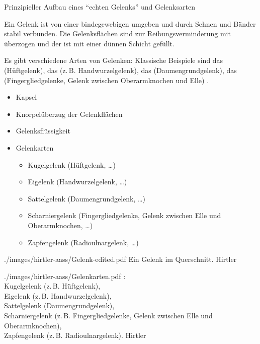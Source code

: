 {Prinzipieller Aufbau eines \protect\enquote{echten Gelenks}
und Gelenksarten}
{%
Ein Gelenk ist von einer bindegewebigen  umgeben
und durch Sehnen und Bänder stabil verbunden.
Die Gelenksflächen sind zur Reibungs\-ver\-minderung mit 
 überzogen und der  ist mit
einer dünnen Schicht 
 gefüllt. 

%
%
%
%
%
%
Es gibt verschiedene Arten von Gelenken: Klassische
Beispiele sind das  (Hüftgelenk),
 das  (z.\,B. Handwurzelgelenk),
das  (Daumengrundgelenk), das
 (Fingergliedgelenke, Gelenk zwischen
Oberarmknochen und Elle) .


\bigskip

\bigskip

}{%
\begin{itemize}
  \item Kapsel
  \item Knorpelüberzug der Gelenkflächen
  \item Gelenksflüssigkeit
  \item Gelenkarten
  \begin{itemize}
  \item Kugelgelenk (Hüftgelenk, \ldots)
  \item Eigelenk (Handwurzelgelenk, \ldots)
  \item Sattelgelenk (Daumengrundgelenk, \ldots)
  \item Scharniergelenk (Fingergliedgelenke, Gelenk zwischen Elle und
  Oberarmknochen, \ldots)
  \item Zapfengelenk (Radioulnargelenk, \ldots)
\end{itemize}
\end{itemize}
}
{./images/hirtler-aass/Gelenk-edited.pdf}
{Ein Gelenk im Querschnitt.}
{Hirtler}




{}
{}
{}
{./images/hirtler-aass/Gelenkarten.pdf}
{: \\
   Kugel\-gelenk (z.\,B. Hüft\-gelenk),\\
   Ei\-gelenk (z.\,B. Hand\-wurzel\-gelenk),\\
   Sattelgelenk (Daumen\-grund\-ge\-lenk),\\
   Scharniergelenk (z.\,B.
  Finger\-glied\-ge\-lenke, Ge\-lenk zwi\-schen Elle und
  Ober\-arm\-kno\-chen),\\
   Zapfengelenk (z.\,B.
  Radioulnargelenk). }
{Hirtler}



